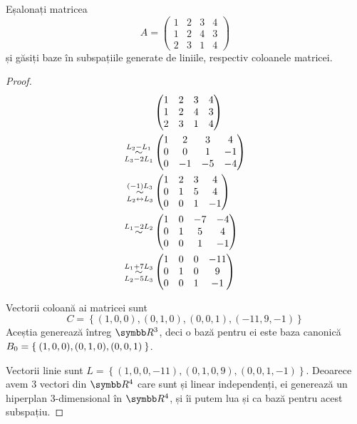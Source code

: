 \begin{exercise}[212]
Eșalonați matricea
\[
    A = \begin{pmatrix}
    1 & 2 & 3 & 4 \\
    1 & 2 & 4 & 3 \\
    2 & 3 & 1 & 4
    \end{pmatrix}
\]
și găsiți baze în subspațiile generate de liniile, respectiv coloanele matricei.
\end{exercise}
\begin{proof}
\begin{align*}
    &\begin{pmatrix}
    1 & 2 & 3 & 4 \\
    1 & 2 & 4 & 3 \\
    2 & 3 & 1 & 4
    \end{pmatrix} \\
    \operatorname*{\sim}^{L_2 - L_1}_{L_3 - 2 L_1}
    &\begin{pmatrix}
    1 & 2 & 3 & 4 \\
    0 & 0 & 1 & -1 \\
    0 & -1 & -5 & -4
    \end{pmatrix} \\
    \operatorname*{\sim}^{(-1) L_3}_{L_2 \leftrightarrow L_3}
    &\begin{pmatrix}
    1 & 2 & 3 & 4 \\
    0 & 1 & 5 & 4 \\
    0 & 0 & 1 & -1
    \end{pmatrix} \\
    \operatorname*{\sim}^{L_1 - 2 L_2}
    &\begin{pmatrix}
    1 & 0 & -7 & -4 \\
    0 & 1 & 5 & 4 \\
    0 & 0 & 1 & -1
    \end{pmatrix} \\
    \operatorname*{\sim}^{L_1 + 7 L_3}_{L_2 - 5 L_3}
    &\begin{pmatrix}
    1 & 0 & 0 & -11 \\
    0 & 1 & 0 & 9 \\
    0 & 0 & 1 & -1
    \end{pmatrix}
\end{align*}

Vectorii coloană ai matricei sunt
\[
    C = \left\lbrace (1, 0, 0), (0, 1, 0), (0, 0, 1), (-11, 9, -1) \right\rbrace
\]
Aceștia generează întreg \(\reals^3\), deci o bază pentru ei este baza canonică \(B_0 = \Set{ (1, 0, 0), (0, 1, 0), (0, 0, 1) }\).

Vectorii linie sunt \(L = \left\lbrace (1, 0, 0, -11), (0, 1, 0, 9), (0, 0, 1, -1) \right\rbrace\). Deoarece avem 3 vectori din \(\reals^4\) care sunt și linear independenți, ei generează un hiperplan 3-dimensional în \(\reals^4\), și îi putem lua și ca bază pentru acest subspațiu.
\end{proof}


